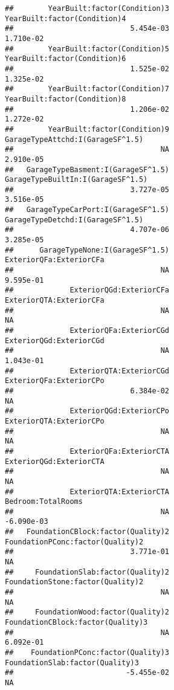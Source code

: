 \documentclass[
]{article}
\begin{document}
\begin{verbatim}
##        YearBuilt:factor(Condition)3         YearBuilt:factor(Condition)4  
##                           5.454e-03                            1.710e-02  
##        YearBuilt:factor(Condition)5         YearBuilt:factor(Condition)6  
##                           1.525e-02                            1.325e-02  
##        YearBuilt:factor(Condition)7         YearBuilt:factor(Condition)8  
##                           1.206e-02                            1.272e-02  
##        YearBuilt:factor(Condition)9     GarageTypeAttchd:I(GarageSF^1.5)  
##                                  NA                            2.910e-05  
##   GarageTypeBasment:I(GarageSF^1.5)    GarageTypeBuiltIn:I(GarageSF^1.5)  
##                           3.727e-05                            3.516e-05  
##   GarageTypeCarPort:I(GarageSF^1.5)     GarageTypeDetchd:I(GarageSF^1.5)  
##                           4.707e-06                            3.285e-05  
##      GarageTypeNone:I(GarageSF^1.5)              ExteriorQFa:ExteriorCFa  
##                                  NA                            9.595e-01  
##             ExteriorQGd:ExteriorCFa              ExteriorQTA:ExteriorCFa  
##                                  NA                                   NA  
##             ExteriorQFa:ExteriorCGd              ExteriorQGd:ExteriorCGd  
##                                  NA                            1.043e-01  
##             ExteriorQTA:ExteriorCGd              ExteriorQFa:ExteriorCPo  
##                           6.384e-02                                   NA  
##             ExteriorQGd:ExteriorCPo              ExteriorQTA:ExteriorCPo  
##                                  NA                                   NA  
##             ExteriorQFa:ExteriorCTA              ExteriorQGd:ExteriorCTA  
##                                  NA                                   NA  
##             ExteriorQTA:ExteriorCTA                   Bedroom:TotalRooms  
##                                  NA                           -6.090e-03  
##   FoundationCBlock:factor(Quality)2     FoundationPConc:factor(Quality)2  
##                           3.771e-01                                   NA  
##     FoundationSlab:factor(Quality)2     FoundationStone:factor(Quality)2  
##                                  NA                                   NA  
##     FoundationWood:factor(Quality)2    FoundationCBlock:factor(Quality)3  
##                                  NA                            6.092e-01  
##    FoundationPConc:factor(Quality)3      FoundationSlab:factor(Quality)3  
##                          -5.455e-02                                   NA  

\end{verbatim}
\end{document}
